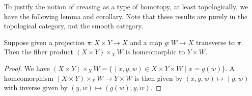 \begin{comment}
	\begin{convention}\label{C: regular value setup}
		In what follows it will typically be useful, and sometimes necessary, in the cases of both chains and cochains to assume that $M$ is a manifold without boundary and $\varphi \colon W \to (-1,1)$ has the form $W \xr{r_W}M \xr{\phi} (-1,1)$ with $\phi \colon M \to (-1,1)$ having $0$ as a regular value so that $M^0$ and $M^\pm$ are fiber products and thus manifolds with corners as in Example \ref{E: manifold decomposition}.
		Also as observed there, in this case $\varphi$ has $0$ as a regular value if and only if $r_W$ is transverse to $M^0$, in which case we also have $W^0 = M^0 \times_M W$ and $W^\pm = M^\pm \times_M W$.
		Unless noted, we will always assume this situation when working with creasing, i.e.\ that we have a fixed $\phi \colon M \to (-1,1)$ with $0$ a regular value and that creasing is defined with respect to the composition $\varphi = \phi r_W$, assuming $r_W$ is transverse to $M^0$.
	\end{convention}

	As usual, we typically abuse notation and, depending on context, may write $\Cre(W)$ to refer to the space $D\times_{(-1,1)} W$, the space together with its map to $W$, or, as we shall see below, refer to

	If we are treating $\varphi \colon W \to (-1,1)$ as oriented, then we interpret $\Cre(W)$ as oriented.
	If we are treating $\varphi \colon W \to (-1,1)$ as co-oriented, then we interpret $\Cre(W)$ as co-oriented.
\end{comment}

To justify the notion of creasing as a type of homotopy, at least topologically, we have the following lemma and corollary.
Note that these results are purely in the topological category, not the smooth category.

\begin{lemma}
	Suppose given a projection $\pi \colon X \times Y \to X$ and a map $g \colon W \to X$ transverse to $\pi$.
	Then the fiber product $(X \times Y) \times_X W$ is homeomorphic to $Y \times W$.
\end{lemma}

\begin{proof}
	We have $(X \times Y) \times_X W = \{(x,y,w) \in X \times Y \times W \mid x = g(w)\}$.
	A homeomorphism $(X \times Y) \times_X W \to Y \times W$ is then given by $(x,y,w) \mapsto (y,w)$ with inverse given by $(y,w) \mapsto (g(w),y,w)$.
\end{proof}

